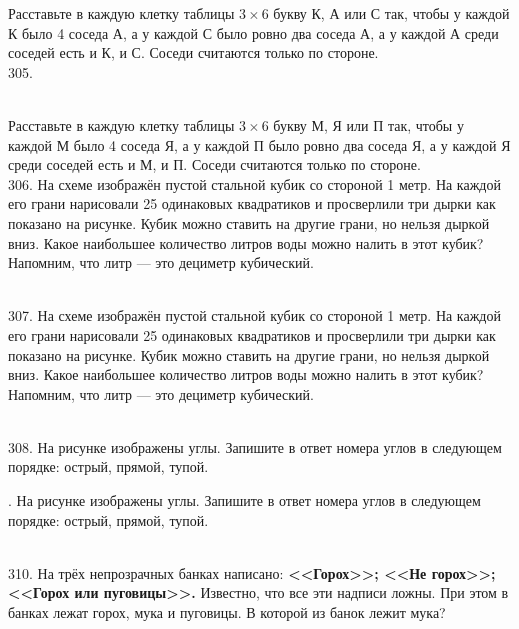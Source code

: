 Расставьте в каждую клетку таблицы $3\times6$ букву К, А или С так, чтобы у каждой К было 4 соседа А, а у каждой С было ровно два соседа А, а у каждой А среди соседей есть и К, и С. Соседи считаются только по стороне.\\
305. \begin{figure}[ht!]
\end{figure}\\
Расставьте в каждую клетку таблицы $3\times6$ букву М, Я или П так, чтобы у каждой М было 4 соседа Я, а у каждой П было ровно два соседа Я, а у каждой Я среди соседей есть и М, и П. Соседи считаются только по стороне.\\
306. На схеме изображён пустой стальной кубик со стороной 1 метр. На каждой его грани нарисовали 25 одинаковых квадратиков и просверлили три дырки как показано на рисунке. Кубик можно ставить на другие грани, но нельзя дыркой вниз. Какое наибольшее количество литров воды можно налить в этот кубик? Напомним, что литр --- это дециметр кубический.
\begin{figure}[ht!]
\end{figure}\\
307. На схеме изображён пустой стальной кубик со стороной 1 метр. На каждой его грани нарисовали 25 одинаковых квадратиков и просверлили три дырки как показано на рисунке. Кубик можно ставить на другие грани, но нельзя дыркой вниз. Какое наибольшее количество литров воды можно налить в этот кубик? Напомним, что литр --- это дециметр кубический.
\begin{figure}[ht!]
\end{figure}\\
308. На рисунке изображены углы. Запишите в ответ номера углов в следующем порядке: острый, прямой, тупой.\\
\begin{figure}[ht!]
\end{figure}\newpage{}. На рисунке изображены углы. Запишите в ответ номера углов в следующем порядке: острый, прямой, тупой.\\
\begin{figure}[ht!]
\end{figure}\\
310. На трёх непрозрачных банках написано: {\bf <<Горох>>; <<Не горох>>; <<Горох или пуговицы>>.} Известно, что все эти надписи ложны. При этом в банках лежат горох, мука и пуговицы. В которой из банок лежит мука?\\
